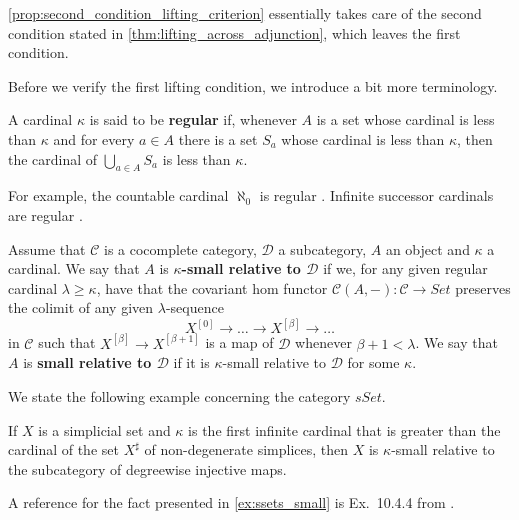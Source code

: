 \noindent \cref{prop:second_condition_lifting_criterion} essentially takes care of the second condition stated in \cref{thm:lifting_across_adjunction}, which leaves the first condition.

Before we verify the first lifting condition, we introduce a bit more terminology.
\begin{definition}\label{def:regular_cardinal}
A cardinal $\kappa$ is said to be \textbf{regular} if, whenever $A$ is a set whose cardinal is less than $\kappa$ and for every $a\in A$ there is a set $S_a$ whose cardinal is less than $\kappa$, then the cardinal of $\bigcup _{a\in A}S_a$ is less than $\kappa$.
\end{definition}
\noindent For example, the countable cardinal $\aleph _0$ is regular \cite[Ex.~10.1.12]{Hi03}. Infinite successor cardinals are regular \cite[Prop.~10.1.14]{Hi03}.
\begin{definition}\label{def:smallness}
Assume that $\mathscr{C}$ is a cocomplete category, $\mathscr{D}$ a subcategory, $A$ an object and $\kappa$ a cardinal. We say that $A$ is \textbf{$\kappa$-small relative to $\mathscr{D}$} if we, for any given regular cardinal $\lambda \geq \kappa$, have that the covariant hom functor $\mathscr{C} (A,-):\mathscr{C} \to Set$ preserves the colimit of any given $\lambda$-sequence
\[X^{[0]}\to \dots \to X^{[\beta ]}\to \dots\]
in $\mathscr{C}$ such that $X^{[\beta ]}\to X^{[\beta +1]}$ is a map of $\mathscr{D}$ whenever $\beta +1<\lambda$. We say that $A$ is \textbf{small relative to $\mathscr{D}$} if it is $\kappa$-small relative to $\mathscr{D}$ for some $\kappa$.
\end{definition}
\noindent We state the following example concerning the category $sSet$.
\begin{example}\label{ex:ssets_small}
If $X$ is a simplicial set and $\kappa$ is the first infinite cardinal that is greater than the cardinal of the set $X^\sharp$ of non-degenerate simplices, then $X$ is $\kappa$-small relative to the subcategory of degreewise injective maps.
\end{example}
\noindent A reference for the fact presented in \cref{ex:ssets_small} is Ex.~10.4.4 from \cite[pp.~194]{Hi03}.

